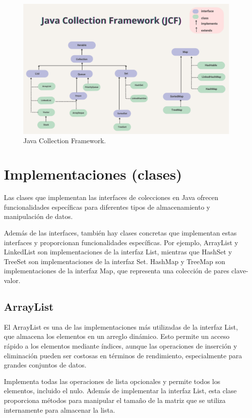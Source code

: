 \documentclass[a4paper,12pt]{article}
\begin{document}
\begin{figure}[ht]
    \centering
    \includegraphics[width=.9\textwidth]{media/java_collection_framework.PNG}
    \caption{Java Collection Framework. \cite{nieva-2023}}
    \label{fig:enter-label}
\end{figure}

\section{Implementaciones (clases)}

Las clases que implementan las interfaces de colecciones en Java ofrecen funcionalidades específicas para diferentes tipos de almacenamiento y manipulación de datos.

Además de las interfaces, también hay clases concretas que implementan estas interfaces y proporcionan funcionalidades específicas. Por ejemplo, ArrayList y LinkedList son implementaciones de la interfaz List, mientras que HashSet y TreeSet son implementaciones de la interfaz Set. HashMap y TreeMap son implementaciones de la interfaz Map, que representa una colección de pares clave-valor.

\subsection{ArrayList}

El ArrayList es una de las implementaciones más utilizadas de la interfaz List, que almacena los elementos en un arreglo dinámico. Esto permite un acceso rápido a los elementos mediante índices, aunque las operaciones de inserción y eliminación pueden ser costosas en términos de rendimiento, especialmente para grandes conjuntos de datos.

Implementa todas las operaciones de lista opcionales y permite todos los elementos, incluido el nulo. Además de implementar la interfaz List, esta clase proporciona métodos para manipular el tamaño de la matriz que se utiliza internamente para almacenar la lista. \cite{array_list}
\end{document}
